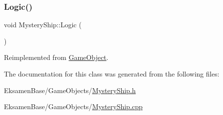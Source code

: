 \subsubsection{\texorpdfstring{Logic()}{Logic()}}
{\footnotesize\ttfamily void Mystery\+Ship\+::\+Logic (\begin{DoxyParamCaption}{ }\end{DoxyParamCaption})\hspace{0.3cm}{\ttfamily [virtual]}}



Reimplemented from \mbox{\hyperlink{class_game_object_a79510ffc77339fe850491dce9f580fa9}{Game\+Object}}.



The documentation for this class was generated from the following files\+:\begin{DoxyCompactItemize}
\item 
Eksamen\+Base/\+Game\+Objects/\mbox{\hyperlink{_mystery_ship_8h}{Mystery\+Ship.\+h}}\item 
Eksamen\+Base/\+Game\+Objects/\mbox{\hyperlink{_mystery_ship_8cpp}{Mystery\+Ship.\+cpp}}\end{DoxyCompactItemize}

